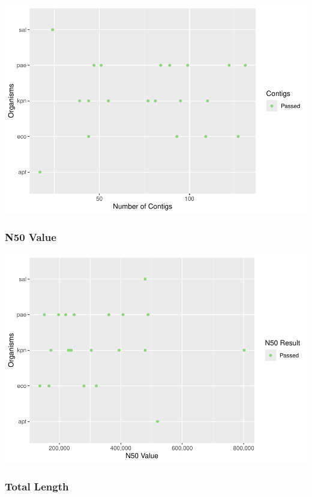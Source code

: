 \documentclass[
  a4paper,
]{article}
\begin{document}
\includegraphics{qualifyr_report_2024-07-04_files/figure-latex/unnamed-chunk-1-1.pdf}

\subsubsection{N50 Value}\label{n50-value}

\includegraphics{qualifyr_report_2024-07-04_files/figure-latex/n50_result -1.pdf}

\subsubsection{Total Length}\label{total-length}
\end{document}

